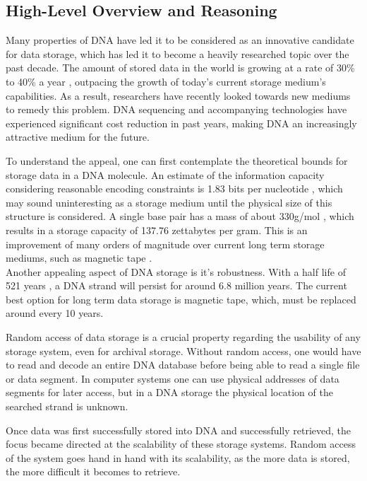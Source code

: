 \documentclass[a4paper,conference]{IEEEtran}
\begin{document}
\subsection{High-Level Overview and Reasoning}
Many properties of DNA have led it to be considered as an innovative candidate for data storage, which has led it to become a heavily researched topic over the past decade. The amount of stored data in the world is growing at a rate of 30\% to 40\% a year \cite{globaldatagrowth}, outpacing the growth of today's current storage medium's capabilities. As a result, researchers have recently looked towards new mediums to remedy this problem. DNA sequencing and accompanying technologies have experienced significant cost reduction in past years, making DNA an increasingly attractive medium for the future. 

To understand the appeal, one can first contemplate the theoretical bounds for storage data in a DNA molecule.  An estimate of the information capacity considering reasonable encoding constraints is 1.83 bits per nucleotide \cite{1}, which may sound uninteresting as a storage medium until the physical size of this structure is considered.  A single base pair has a mass of about 330g/mol \cite{2}, which results in a storage capacity of 137.76 zettabytes per gram. This is an improvement of many orders of magnitude over current long term storage mediums, such as magnetic tape \cite{?}.\\

Another appealing aspect of DNA storage is it's robustness. With a half life of 521 years \cite{dnahalflife}, a DNA strand will persist for around 6.8 million years. The current best option for long term data storage is magnetic tape, which, must be replaced around every 10 years.

Random access of data storage is a crucial property regarding the usability of any storage system, even for archival storage. Without random access, one would have to read and decode an entire DNA database before being able to read a single file or data segment. In computer systems one can use physical addresses of data segments for later access, but in a DNA storage the physical location of the searched strand is unknown. 

Once data was first successfully stored into DNA and successfully retrieved, the focus became directed at the scalability of these storage systems. Random access of the system goes hand in hand with its scalability, as the more data is stored, the more difficult it becomes to retrieve.
\end{document}
